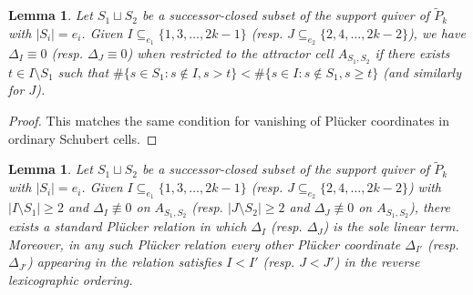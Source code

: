 \documentclass{amsart}
\newtheorem{lemma}[theorem]{Lemma}
\numberwithin{equation}{section}
\begin{document}
  \begin{lemma}
    Let $S_1\sqcup S_2$ be a successor-closed subset of the support quiver of $\tilde P_k$ with $|S_i|=e_i$.
    Given $I \subseteq_{e_1} \{1,3,\ldots,2k-1\}$ (resp. $J \subseteq_{e_2} \{2,4,\ldots, 2k-2\}$), we have $\Delta_I\equiv 0$ (resp. $\Delta_J\equiv 0$) when restricted to the attractor cell $A_{S_1,S_2}$ if there exists $t\in I\setminus S_1$ such that $\#\{s\in S_1:s\notin I, s>t\} < \#\{s\in I:s\notin S_1, s \ge t\}$ (and similarly for $J$).
  \end{lemma}
  \begin{proof}
    This matches the same condition for vanishing of Pl\"ucker coordinates in ordinary Schubert cells.
  \end{proof}

  \begin{lemma}
    Let $S_1\sqcup S_2$ be a successor-closed subset of the support quiver of $\tilde P_k$ with $|S_i|=e_i$.
    Given $I \subseteq_{e_1} \{1,3,\ldots,2k-1\}$ (resp. $J \subseteq_{e_2} \{2,4,\ldots, 2k-2\}$) with $|I\setminus S_1|\ge2$ and $\Delta_I\not\equiv 0$ on $A_{S_1,S_2}$ (resp. $|J\setminus S_2|\ge 2$ and $\Delta_J\not\equiv 0$ on $A_{S_1,S_2}$), there exists a standard Pl\"ucker relation in which $\Delta_I$ (resp. $\Delta_J$) is the sole linear term.
    Moreover, in any such Pl\"ucker relation every other Pl\"ucker coordinate $\Delta_{I'}$ (resp. $\Delta_{J'}$) appearing in the relation satisfies $I<I'$ (resp. $J<J'$) in the reverse lexicographic ordering.
  \end{lemma}
\end{document}
